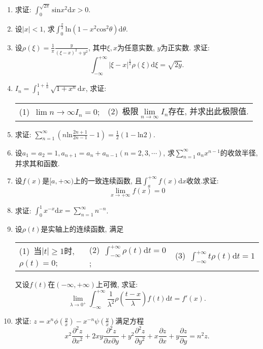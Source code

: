 \begin{enumerate}
\item 求证: $\displaystyle{\int_{0}^{\sqrt{2\pi}}\mathrm{sin}x^2\mathrm{d}x}>0$.
\item 设$|x|<1$, 求$\displaystyle{\int_{0}^{\frac{\pi}{2}}\mathrm{ln}(1-x^2\mathrm{cos}^2\theta)\mathrm{d}\theta}$.
\item 设$\rho(\xi)=\frac{1}{\pi}\frac{y}{(\xi-x)^2+y^2}$, 其中$\xi,x$为任意实数, $y$为正实数. 求证:$$ \displaystyle{\int_{-\infty}^{+\infty}|\xi - x|^\frac{1}{2}\rho(\xi)\mathrm{d}\xi=\sqrt{2y}}.$$
\item $I_n=\displaystyle{\int_{1}^{1+\frac{1}{n}}\sqrt{1+x^n}\mathrm{d}x}$, 求证:
\begin{table}[H]
	\begin{tabular}{ll}
		(1)\ $\lim\limits{n\rightarrow \infty}I_n=0$;\qquad \qquad \qquad \qquad & (2)\ 极限$\lim\limits_{n\rightarrow \infty}I_n$存在, 并求出此极限值.
	\end{tabular}
\end{table}	
\item 求证: $\sum\limits_{n=1}^{\infty}(n\mathrm{ln}\frac{2n+1}{2n-1}-1)=\frac{1}{2}(1-\mathrm{ln}2)$.
\item 设$a_1=a_2=1,a_{n+1}=a_n+a_{n-1}(n=2,3,\cdots)$, 求$\sum\limits_{n=1}^{\infty}a_nx^{n-1}$的收敛半径, 并求其和函数.
\item 设$f(x)$是$[a,+\infty)$上的一致连续函数, 且$\displaystyle{\int_{a}^{+\infty}f(x)\mathrm{d}x}$收敛.求证:$$\lim\limits_{x\rightarrow +\infty}f(x)=0$$
\item 求证: $\displaystyle{\int_{0}^{1}x^{-x}\mathrm{d}x=\sum\limits_{n=1}^{\infty}n^{-n}}$.
	\item 设$\rho(t)$是实轴上的连续函数, 满足
	\begin{table}[H]
		\begin{tabular}{lll}
			(1)\ 当$|t|\ge 1$时, $\rho(t)=0$;\qquad \qquad & (2)\ $\displaystyle{\int_{-\infty}^{+\infty}\rho(t)\mathrm{d}t}=0$;\qquad \qquad & (3)\ $\displaystyle{\int_{-\infty}^{+\infty}t\rho(t)\mathrm{d}t=1}$
		\end{tabular}
	\end{table}
又设$f(t)$在$(-\infty,+\infty)$上可微, 求证:
$$ \displaystyle{\lim\limits_{\lambda\rightarrow0^+}\int_{-\infty}^{+\infty}\frac{1}{\lambda^2}\rho(\frac{t-x}{\lambda})f(t)\mathrm{d}t=f'(x).}$$
	\item 求证: $z=x^n\phi(\frac{y}{x})-x^{-n}\psi(\frac{y}{x})$满足方程$$x^2\frac{\partial^2 z}{\partial x^2} +2xy\frac{\partial^2 z}{\partial x\partial y} +y^2\frac{\partial^2z}{\partial y^2}+x\frac{\partial z}{\partial x}+y\frac{\partial z}{\partial y} = n^2z.$$

\end{enumerate}

